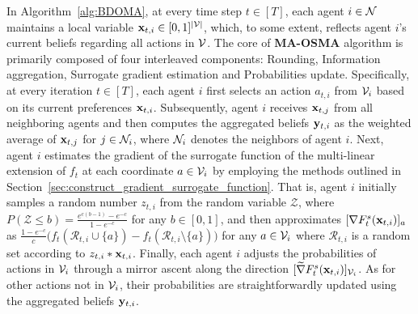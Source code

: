 	In Algorithm~\ref{alg:BDOMA}, at every time step $t \in [T]$, each agent $i \in\mathcal{N}$ maintains a local variable $\mathbf{x}_{t,i}\in[0,1]^{|\mathcal{V}|}$, which, to some extent, reflects agent $i$'s current beliefs regarding all actions in $\mathcal{V}$. The core of \textbf{MA-OSMA} algorithm is primarily composed of four interleaved components: Rounding, Information aggregation, Surrogate gradient estimation and Probabilities update. Specifically, at every iteration $t\in[T]$, each agent $i$ first selects an action $a_{t,i}$ from $\mathcal{V}_{i}$ based on its current preferences $\mathbf{x}_{t,i}$. Subsequently, agent $i$ receives $\mathbf{x}_{t,j}$ from all neighboring agents and then computes the aggregated beliefs $\mathbf{y}_{t,i}$ as the weighted average of $\mathbf{x}_{t,j}$ for $j\in\mathcal{N}_{i}$, where $\mathcal{N}_{i}$ denotes the neighbors of agent $i$. Next, agent $i$ estimates the gradient of the surrogate function of the multi-linear extension of $f_{t}$ at each coordinate $a\in\mathcal{V}_{i}$ by employing the methods outlined in Section~\ref{sec:construct_gradient_surrogate_function}. That is, agent $i$ initially samples a random number $z_{t,i}$ from the random variable $\mathcal{Z}$, where $P(\mathcal{Z}\le b)=\frac{e^{c(b-1)}-e^{-c}}{1-e^{-c}}$ for any $b\in[0,1]$, and then approximates $[\nabla F_{t}^{s}(\mathbf{x}_{t,i})]_{a}$ as $\frac{1-e^{-c}}{c} \big(f_{t}(\mathcal{R}_{t,i}\cup\{a\})-f_{t}(\mathcal{R}_{t,i}\setminus\{a\})\big)$ for any $a\in\mathcal{V}_{i}$ where $\mathcal{R}_{t,i}$ is a random set according to $z_{t,i}*\mathbf{x}_{t,i}$. Finally, each agent $i$ adjusts the probabilities of actions in $\mathcal{V}_{i}$ through a mirror ascent along the direction $[\widetilde{\nabla} F_{t}^{s}(\mathbf{x}_{t,i})]_{\mathcal{V}_{i}}$. As for other actions not in $\mathcal{V}_{i}$, 
   their probabilities are straightforwardly updated using the aggregated beliefs $\mathbf{y}_{t,i}$.
   
